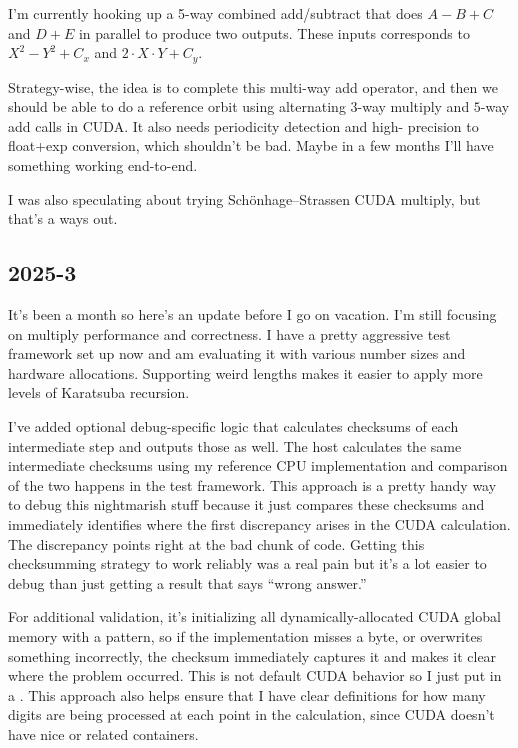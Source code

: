 I'm currently hooking up a 5-way combined add/subtract that does $A - B + C$ 
and $D + E$ in parallel to produce two outputs.  These inputs corresponds to $X^
2 - Y^2 + C_x$ and $2\cdot X\cdot Y + C_y$.

Strategy-wise, the idea is to complete this multi-way add operator, and then we 
should be able to do a reference orbit using alternating $3$-way multiply and $5
$-way add calls in CUDA.  It also needs periodicity detection and high-
precision to float+exp conversion, which shouldn't be bad.  Maybe in a few 
months I'll have something working end-to-end.

I was also speculating about trying Schönhage--Strassen CUDA multiply, but 
that's a ways out.

\subsection{2025-3}

It's been a month so here's an update before I go on vacation.  I'm still 
focusing on multiply performance and correctness.  I have a pretty aggressive 
test framework set up now and am evaluating it with various number sizes and 
hardware allocations.  Supporting weird lengths makes it easier to apply more 
levels of Karatsuba recursion.

I've added optional debug-specific logic that calculates checksums of each 
intermediate step and outputs those as well.  The host calculates the same 
intermediate checksums using my reference CPU implementation and comparison of 
the two happens in the test framework.  This approach is a pretty handy way to 
debug this nightmarish stuff because it just compares these checksums and 
immediately identifies where the first discrepancy arises in the CUDA 
calculation.  The discrepancy points right at the bad chunk of code.  Getting 
this checksumming strategy to work reliably was a real pain but it's a lot 
easier to debug than just getting a result that says ``wrong answer.''

For additional validation, it's initializing all dynamically-allocated CUDA 
global memory with a  pattern, so if the implementation 
misses a byte, or overwrites something incorrectly, the checksum immediately 
captures it and makes it clear where the problem occurred.  This is not default 
CUDA behavior so I just put in a .  This approach also helps 
ensure that I have clear definitions for how many digits are being processed at 
each point in the calculation, since CUDA doesn't have nice 
 or related containers.

